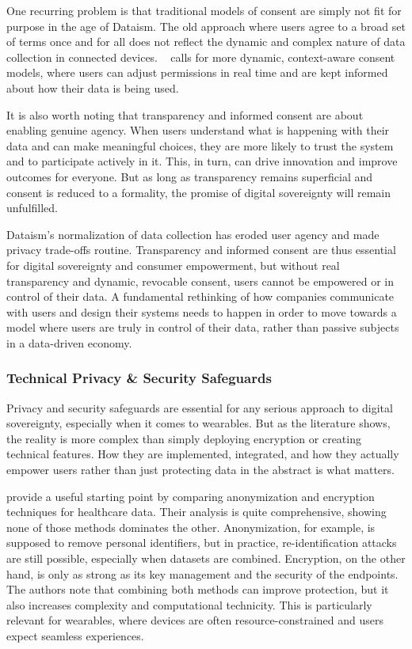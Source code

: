 	One recurring problem is that traditional models of consent are simply not fit for purpose in the age of Dataism. The old approach where users agree to a broad set of terms once and for all does not reflect the dynamic and complex nature of data collection in connected devices. ~\cite{Safavi2014} calls for more dynamic, context-aware consent models, where users can adjust permissions in real time and are kept informed about how their data is being used.

	It is also worth noting that transparency and informed consent are about enabling genuine agency. When users understand what is happening with their data and can make meaningful choices, they are more likely to trust the system and to participate actively in it. This, in turn, can drive innovation and improve outcomes for everyone. But as long as transparency remains superficial and consent is reduced to a formality, the promise of digital sovereignty will remain unfulfilled.

	Dataism’s normalization of data collection has eroded user agency and made privacy trade-offs routine.
	Transparency and informed consent are thus essential for digital sovereignty and consumer empowerment, but without real transparency and dynamic, revocable consent, users cannot be empowered or in control of their data. A fundamental rethinking of how companies communicate with users and design their systems needs to happen in order to move towards a model where users are truly in control of their data, rather than passive subjects in a data-driven economy.
	\subsubsection{Technical Privacy \& Security Safeguards}

	Privacy and security safeguards are essential for any serious approach to digital sovereignty, especially when it comes to wearables. But as the literature shows, the reality is more complex than simply deploying encryption or creating technical features. How they are implemented, integrated, and how they actually empower users rather than just protecting data in the abstract is what matters.

	\cite{Abouelmehdi2018} provide a useful starting point by comparing anonymization and encryption techniques for healthcare data. Their analysis is quite comprehensive, showing none of those methods dominates the other. Anonymization, for example, is supposed to remove personal identifiers, but in practice, re-identification attacks are still possible, especially when datasets are combined. Encryption, on the other hand, is only as strong as its key management and the security of the endpoints. The authors note that combining both methods can improve protection, but it also increases complexity and computational technicity. This is particularly relevant for wearables, where devices are often resource-constrained and users expect seamless experiences.


